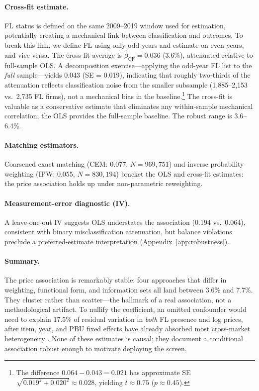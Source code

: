 \paragraph{Cross-fit estimate.}
FL status is defined on the same 2009--2019 window used for
estimation, potentially creating a mechanical link between
classification and outcomes. To break this link, we define FL using
only odd years and estimate on even years, and vice versa. The
cross-fit average is $\hat{\beta}_{\text{CF}} = 0.036$ (3.6\%),
attenuated relative to full-sample OLS. A decomposition
exercise---applying the odd-year FL list to the \emph{full}
sample---yields 0.043 (SE = 0.019), indicating that roughly
two-thirds of the attenuation reflects classification noise from
the smaller subsample (1,885--2,153 vs.\ 2,735 FL firms),
not a mechanical bias in the baseline.\footnote{The difference
$0.064 - 0.043 = 0.021$ has approximate SE
$\sqrt{0.019^2 + 0.020^2} \approx 0.028$, yielding $t \approx 0.75$
($p \approx 0.45$).}
The cross-fit is valuable as a conservative estimate that eliminates
any within-sample mechanical correlation; the OLS provides the
full-sample baseline. The robust range is 3.6--6.4\%.

\paragraph{Matching estimators.}
Coarsened exact matching (CEM: 0.077, $N = 969{,}751$) and inverse
probability weighting (IPW: 0.055, $N = 830{,}194$) bracket the OLS
and cross-fit estimates: the price association holds up under non-parametric
reweighting.

\paragraph{Measurement-error diagnostic (IV).}
A leave-one-out IV suggests OLS understates the association
(0.194 vs.\ 0.064), consistent with binary misclassification
attenuation, but balance violations preclude a preferred-estimate
interpretation (Appendix~\ref{app:robustness}).

\paragraph{Summary.}
The price association is remarkably stable: four approaches that
differ in weighting, functional form, and information sets all land
between 3.6\% and 7.7\%. They cluster rather than scatter---the
hallmark of a real association, not a methodological artifact. To
nullify the coefficient, an omitted confounder would need to explain
17.5\% of residual variation in \emph{both} FL presence and log
prices, after item, year, and PBU fixed effects have already
absorbed most cross-market heterogeneity
\citep{cinelli2020making}. None of these estimates is causal; they
document a conditional association robust enough to motivate
deploying the screen.

